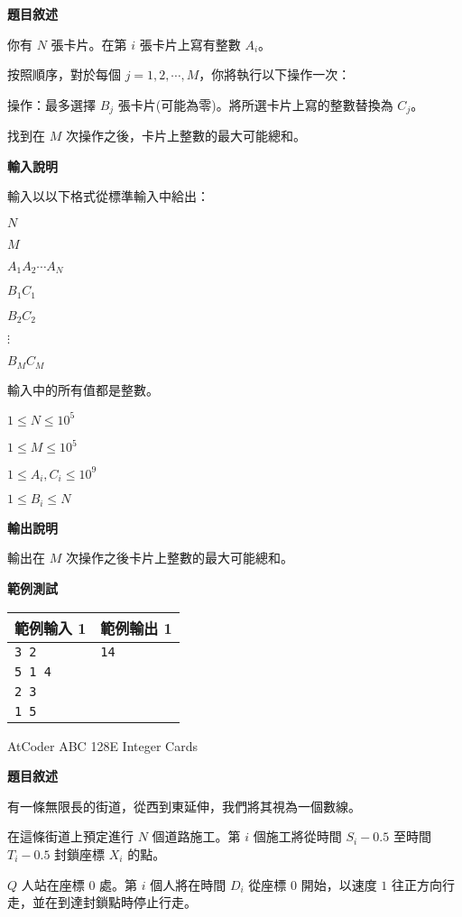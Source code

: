     \textbf{題目敘述}

    你有 $N$ 張卡片。在第 $i$ 張卡片上寫有整數 $A_i$。

    按照順序，對於每個 $j=1,2,\cdots,M$，你將執行以下操作一次：
    
    操作：最多選擇 $B_j$ 張卡片(可能為零)。將所選卡片上寫的整數替換為 $C_j$。
    
    找到在 $M$ 次操作之後，卡片上整數的最大可能總和。

    \textbf{輸入說明}

    輸入以以下格式從標準輸入中給出：

    $N$

    $M$

    $A_1 A_2 \cdots A_N$

    $B_1 C_1$

    $B_2 C_2$

    $\vdots$

    $B_M C_M$

    輸入中的所有值都是整數。

    $1 \le N \le 10^5$

    $1 \le M \le 10^5$

    $1 \le A_i, C_i \le 10^9$

    $1 \le B_i \le N$

    \textbf{輸出說明}

    輸出在 $M$ 次操作之後卡片上整數的最大可能總和。

    \textbf{範例測試}

    \begin{tabular}{|m{7cm}|m{7cm}|}
        \hline
        範例輸入 1 & 範例輸出 1 \\
        \hline
        \verb|3 2| & \verb|14| \\
        \verb|5 1 4| & \\
        \verb|2 3| & \\
        \verb|1 5| & \\
        \hline
    \end{tabular}

    \problem AtCoder ABC 128E Integer Cards

    \textbf{題目敘述}

    有一條無限長的街道，從西到東延伸，我們將其視為一個數線。

    在這條街道上預定進行 $N$ 個道路施工。第 $i$ 個施工將從時間 $S_i - 0.5$ 至時間 $T_i - 0.5$ 封鎖座標 $X_i$ 的點。
    
    $Q$ 人站在座標 $0$ 處。第 $i$ 個人將在時間 $D_i$ 從座標 $0$ 開始，以速度 $1$ 往正方向行走，並在到達封鎖點時停止行走。
    
